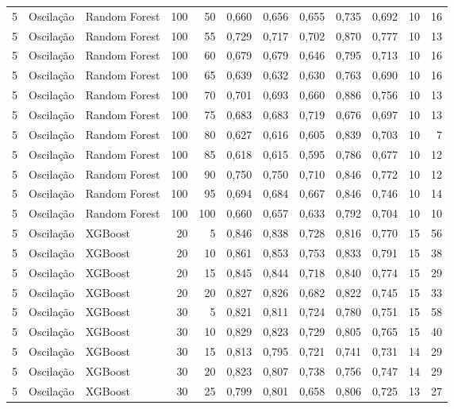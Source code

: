 \begin{longtable}{@{}rllrrrrrrrrr@{}}
5 & Oscilação & Random Forest & 100 & 50 & 0,660 & 0,656 & 0,655 & 0,735 & 0,692 & 10 & 16 \\
5 & Oscilação & Random Forest & 100 & 55 & 0,729 & 0,717 & 0,702 & 0,870 & 0,777 & 10 & 13 \\
5 & Oscilação & Random Forest & 100 & 60 & 0,679 & 0,679 & 0,646 & 0,795 & 0,713 & 10 & 16 \\
5 & Oscilação & Random Forest & 100 & 65 & 0,639 & 0,632 & 0,630 & 0,763 & 0,690 & 10 & 16 \\
5 & Oscilação & Random Forest & 100 & 70 & 0,701 & 0,693 & 0,660 & 0,886 & 0,756 & 10 & 13 \\
5 & Oscilação & Random Forest & 100 & 75 & 0,683 & 0,683 & 0,719 & 0,676 & 0,697 & 10 & 13 \\
5 & Oscilação & Random Forest & 100 & 80 & 0,627 & 0,616 & 0,605 & 0,839 & 0,703 & 10 & 7 \\
5 & Oscilação & Random Forest & 100 & 85 & 0,618 & 0,615 & 0,595 & 0,786 & 0,677 & 10 & 12 \\
5 & Oscilação & Random Forest & 100 & 90 & 0,750 & 0,750 & 0,710 & 0,846 & 0,772 & 10 & 12 \\
5 & Oscilação & Random Forest & 100 & 95 & 0,694 & 0,684 & 0,667 & 0,846 & 0,746 & 10 & 14 \\
5 & Oscilação & Random Forest & 100 & 100 & 0,660 & 0,657 & 0,633 & 0,792 & 0,704 & 10 & 10 \\
5 & Oscilação & XGBoost & 20 & 5 & 0,846 & 0,838 & 0,728 & 0,816 & 0,770 & 15 & 56 \\
5 & Oscilação & XGBoost & 20 & 10 & 0,861 & 0,853 & 0,753 & 0,833 & 0,791 & 15 & 38 \\
5 & Oscilação & XGBoost & 20 & 15 & 0,845 & 0,844 & 0,718 & 0,840 & 0,774 & 15 & 29 \\
5 & Oscilação & XGBoost & 20 & 20 & 0,827 & 0,826 & 0,682 & 0,822 & 0,745 & 15 & 33 \\
5 & Oscilação & XGBoost & 30 & 5 & 0,821 & 0,811 & 0,724 & 0,780 & 0,751 & 15 & 58 \\
5 & Oscilação & XGBoost & 30 & 10 & 0,829 & 0,823 & 0,729 & 0,805 & 0,765 & 15 & 40 \\
5 & Oscilação & XGBoost & 30 & 15 & 0,813 & 0,795 & 0,721 & 0,741 & 0,731 & 14 & 29 \\
5 & Oscilação & XGBoost & 30 & 20 & 0,823 & 0,807 & 0,738 & 0,756 & 0,747 & 14 & 29 \\
5 & Oscilação & XGBoost & 30 & 25 & 0,799 & 0,801 & 0,658 & 0,806 & 0,725 & 13 & 27 \\

\end{longtable}
